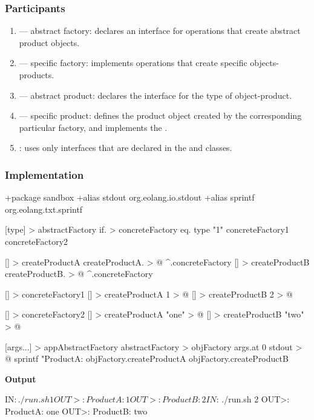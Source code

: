 \documentclass[12pt]{book}
\begin{document}
{{\subsubsection{Participants}
\begin{enumerate}
    \item {} — abstract factory: declares an interface for operations that create abstract product objects.
    \item {} — specific factory: implements operations that create specific objects-products.
    \item {} — abstract product: declares the interface for the type of object-product.
    \item {} — specific product: defines the product object created by the corresponding particular factory, and implements the .
    \item {}: uses only interfaces that are declared in the  and  classes.
\end{enumerate}

\subsubsection{Implementation}
\begin{ffcode}
+package sandbox
+alias stdout org.eolang.io.stdout
+alias sprintf org.eolang.txt.sprintf

[type] > abstractFactory
  if. > concreteFactory
    eq.
      type
      "1"
    concreteFactory1
    concreteFactory2

  [] > createProductA
    createProductA. > @
      ^.concreteFactory
  [] > createProductB
    createProductB. > @
      ^.concreteFactory

  [] > concreteFactory1
    [] > createProductA
      1 > @
    [] > createProductB
      2 > @

  [] > concreteFactory2
    [] > createProductA
      "one" > @
    [] > createProductB
      "two" > @

[args...] > appAbstractFactory
  abstractFactory > objFactory
    args.at 0
  stdout > @
    sprintf
      "ProductA: %
      objFactory.createProductA
      objFactory.createProductB 

\end{ffcode}
\textbf{Output}
\begin{ffcode}
IN$: ./run.sh 1
OUT>: ProductA: 1
OUT>: ProductB: 2
IN$: ./run.sh 2
OUT>: ProductA: one
OUT>: ProductB: two
\end{ffcode}


}}
\end{document}
